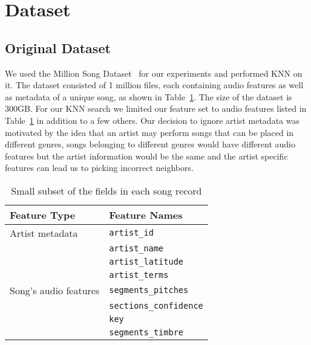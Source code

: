 \section{Dataset}
\label{sec:dataset}
\subsection{Original Dataset}
\label{subsec: meth_orig_dataset}
We used the Million Song Dataset~\cite{msd01} for our experiments and performed KNN on it. 
The dataset consisted of 1 million files, each containing audio features as well as metadata of a unique song, as shown in Table~\ref{table:field_msd_rec}. 
The size of the dataset is 300GB. 
For our KNN search we limited our feature set to audio features listed in Table~\ref{table:field_msd_rec} in addition to a few others. 
Our decision to ignore artist metadata was motivated by the idea that an artist may perform songs that can be placed in different genres, songs belonging to different genres would have different audio features but the artist information would be the same and the artist specific features can lead us to picking incorrect neighbors.
\begin{table}
\begin{center}
\begin{tabular}{| l | l |}
\hline
\textbf{Feature Type} & \textbf{Feature Names} \\
\hline
Artist metadata & \texttt{artist\_id} \\
 & \texttt{artist\_name}\\
 & \texttt{artist\_latitude}\\
 & \texttt{artist\_terms}\\
\hline
Song's audio features & \texttt{segments\_pitches}\\
 & \texttt{sections\_confidence}\\
 & \texttt{key}\\
 & \texttt{segments\_timbre}\\
\hline
\end{tabular}
\caption{Small subset of the fields in each song record}
\label{table:field_msd_rec}
\end{center}
\end{table}

